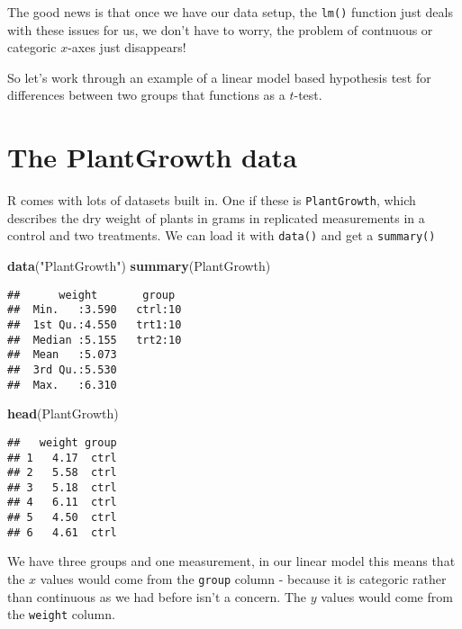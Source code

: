 \documentclass[]{book}
\newenvironment{Shaded}{\begin{snugshade}}{\end{snugshade}}
\newcommand{\KeywordTok}[1]{\textcolor[rgb]{0.13,0.29,0.53}{\textbf{#1}}}
\newcommand{\NormalTok}[1]{#1}
\newcommand{\StringTok}[1]{\textcolor[rgb]{0.31,0.60,0.02}{#1}}
\begin{document}
The good news is that once we have our data setup, the \texttt{lm()} function just deals with these issues for us, we don't have to worry, the problem of contnuous or categoric \(x\)-axes just disappears!

So let's work through an example of a linear model based hypothesis test for differences between two groups that functions as a \(t\)-test.

\hypertarget{the-plantgrowth-data}{%
\section{The PlantGrowth data}\label{the-plantgrowth-data}}

R comes with lots of datasets built in. One if these is \texttt{PlantGrowth}, which describes the dry weight of plants in grams in replicated measurements in a control and two treatments. We can load it with \texttt{data()} and get a \texttt{summary()}

\begin{Shaded}
\begin{Highlighting}[]
\KeywordTok{data}\NormalTok{(}\StringTok{"PlantGrowth"}\NormalTok{)}
\KeywordTok{summary}\NormalTok{(PlantGrowth)}
\end{Highlighting}
\end{Shaded}

\begin{verbatim}
##      weight       group   
##  Min.   :3.590   ctrl:10  
##  1st Qu.:4.550   trt1:10  
##  Median :5.155   trt2:10  
##  Mean   :5.073            
##  3rd Qu.:5.530            
##  Max.   :6.310
\end{verbatim}

\begin{Shaded}
\begin{Highlighting}[]
\KeywordTok{head}\NormalTok{(PlantGrowth)}
\end{Highlighting}
\end{Shaded}

\begin{verbatim}
##   weight group
## 1   4.17  ctrl
## 2   5.58  ctrl
## 3   5.18  ctrl
## 4   6.11  ctrl
## 5   4.50  ctrl
## 6   4.61  ctrl
\end{verbatim}

We have three groups and one measurement, in our linear model this means that the \(x\) values would come from the \texttt{group} column - because it is categoric rather than continuous as we had before isn't a concern. The \(y\) values would come from the \texttt{weight} column.
\end{document}

